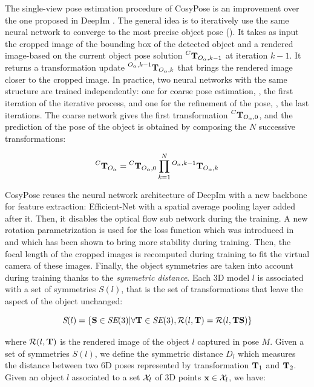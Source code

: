 The single-view pose estimation procedure of CosyPose is an improvement over the one proposed in DeepIm \cite{deepim_2019}. The general idea is to iteratively 
use the same neural network to converge to the most precise object pose (). It takes as input the cropped image of the bounding 
box of the detected object and a rendered image-based on the current object pose solution $\prescript{C}{}{{\bf T}}_{O_{\alpha},k-1}$ at iteration $k-1$. 
It returns a transformation update $\prescript{O_{\alpha},k-1}{}{{\bf T}}_{O_{\alpha},k}$ that brings the rendered image closer to the cropped image. In practice, 
two neural networks with the same structure are trained independently: one for coarse pose estimation, \ie, the first iteration of the iterative process, 
and one for the refinement of the pose, \ie, the last iterations. The coarse network gives the first transformation $\prescript{C}{}{{\bf T}}_{O_{\alpha},0}$, 
and the prediction of the pose of the object is obtained by composing the $N$ successive transformations:

\begin{equation}
\prescript{C}{}{{\bf T}}_{O_{\alpha}} = \prescript{C}{}{{\bf T}}_{O_{\alpha},0} \prod_{k=1}^N  \prescript{O_{\alpha},k-1}{}{{\bf T}}_{O_{\alpha},k}
\end{equation}

CosyPose reuses the neural network architecture of DeepIm with a new backbone for feature extraction: Efficient-Net \cite{tan2020efficientnet} 
with a spatial average pooling layer added after it. Then, it disables the optical flow sub network during the training. 
A new rotation parametrization is used for the loss function which was introduced in \cite{zhou2020continuity} and which has been shown 
to bring more stability during training. Then, the focal length of the cropped images is recomputed during training to fit the virtual camera 
of these images. Finally, the object symmetries are taken into account during training thanks to the \textit{symmetric distance}. 
Each 3D model $l$ is associated with a set of symmetries $S(l)$, that is the set of transformations that leave the aspect of the object unchanged:

\begin{equation}
    \textit{S}(l) = \left \{ {\bf S} \in \textit{SE}(3) | \forall {\bf T} \in \textit{SE}(3), \mathcal{R}(l,{\bf T}) = \mathcal{R}(l,{\bf T} {\bf S})\right \}
\end{equation}

where $\mathcal{R}(l,{\bf T})$ is the rendered image of the object $l$ captured in pose $M$. Given a set of symmetries $S(l)$, 
we define the symmetric distance $D_l$ which measures the distance between two 6D poses represented by transformation ${\bf T}_1$ and ${\bf T}_2$. 
Given an object $l$ associated to a set $\mathcal{X}_l$ of 3D points $\mathbf{x} \in \mathcal{X}_l$, we have:

